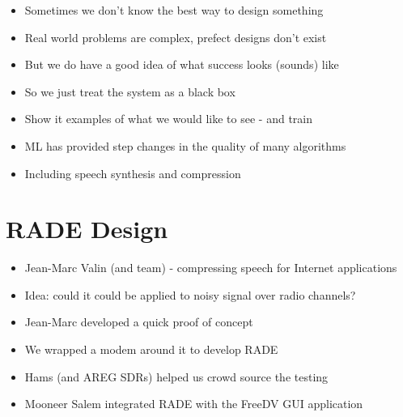 \documentclass{beamer}
\begin{document}
\begin{frame}
\begin{itemize}
	\item Sometimes we don't know the best way to design something
	\item Real world problems are complex, prefect designs don't exist
	\item But we do have a good idea of what success looks (sounds) like
	\item So we just treat the system as a black box
	\item Show it examples of what we would like to see - and train
	\item ML has provided step changes in the quality of many algorithms
	\item Including speech synthesis and compression
\end{itemize}
\end{frame}

\section{RADE Design}

\begin{frame}
\begin{itemize}
	\item Jean-Marc Valin (and team) - compressing speech for Internet applications
    \item Idea: could it could be applied to noisy signal over radio channels?
    \item Jean-Marc developed a quick proof of concept
    \item We wrapped a modem around it to develop RADE
    \item Hams (and AREG SDRs) helped us crowd source the testing
    \item Mooneer Salem integrated RADE with the FreeDV GUI application
\end{itemize}
\end{frame}
\end{document}
